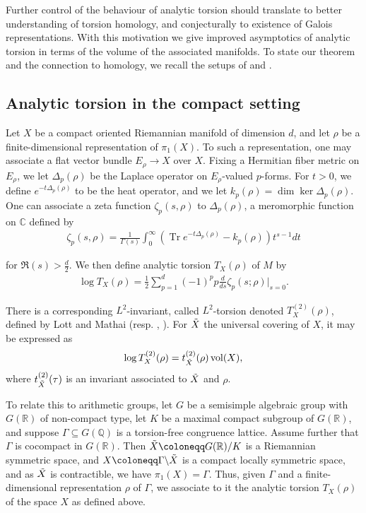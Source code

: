 \documentclass[11pt,reqno]{amsart}
\numberwithin{equation}{section}
\theoremstyle{definition}
\theoremstyle{remark}
\newcommand{\Q}{\mathbb{Q}}
\newcommand{\Tr}{\operatorname{Tr}}
\newcommand{\vol}{\operatorname{vol}}
\renewcommand{\ker}{\operatorname{ker}}
\renewcommand{\dim}{\operatorname{dim}}
\newcommand{\C}{\mathbb{C}}
\newcommand{\R}{\mathbb{R}}
\renewcommand{\subset}{\subseteq}
\begin{document}
Further control of the behaviour of analytic torsion should translate to better understanding of torsion homology, and conjecturally to existence of Galois representations. With this motivation we give improved asymptotics of analytic torsion in terms of the volume of the associated manifolds. To state our theorem and the connection to homology, we recall the setups of \cite{BV} and \cite{MzM2}.

\subsection*{Analytic torsion in the compact setting}

Let $X$ be a compact oriented Riemannian manifold of dimension $d$, and let $\rho$ be a finite-dimensional representation of $\pi_1(X)$. To such a representation, one may associate a flat vector bundle $E_\rho\to X$ over $X$. Fixing a Hermitian fiber metric on $E_\rho$, we let $\Delta_p(\rho)$ be the Laplace operator on $E_\rho$-valued $p$-forms. For $t>0$, we define $e^{-t\Delta_p(\rho)}$ to be the heat operator, and we let $k_p(\rho) =\dim\ker \Delta_p(\rho)$. One can associate a zeta function $\zeta_p(s,\rho)$ to $\Delta_p(\rho)$, a meromorphic function on $\C$ defined by
\begin{align}\label{zeta}
    \zeta_p(s,\rho) = \frac{1}{\Gamma(s)}\int_0^\infty (\Tr e^{-t\Delta_p(\rho)}-k_p(\rho))t^{s-1} dt
\end{align}

\noindent for $\Re(s)>\frac{d}{2}$. We then define analytic torsion $T_X(\rho)$ of $M$ by
\begin{align}
    \log T_X(\rho) =\frac12 \sum_{p=1}^d (-1)^p p\frac{d}{ds}\zeta_p(s;\rho)\vert_{s=0}.
\end{align}

\noindent There is a corresponding $L^2$-invariant, called $L^2$-torsion denoted $T^{(2)}_X(\rho)$, defined by Lott and Mathai (resp. \cite{Lott}, \cite{Mathai}). For $\Tilde{X}$ the universal covering of $X$, it may be expressed as
\begin{align}\label{l2torsion}
    \log T^{(2)}_X(\rho) = t^{(2)}_{\Tilde{X}}(\rho)\vol(X),
\end{align}
where $t^{(2)}_{\Tilde{X}}(\tau)$ is an invariant associated to $\Tilde{X}$ and $\rho$.

To relate this to arithmetic groups, let $G$ be a semisimple algebraic group with $G(\R)$ of non-compact type, let $K$ be a maximal compact subgroup of $G(\R)$, and suppose $\Gamma\subset G(\Q)$ is a torsion-free congruence lattice. Assume further that $\Gamma$ is cocompact in $G(\R)$. Then $\Tilde{X}\coloneqq G(\R)/K$ is a Riemannian symmetric space, and $X\coloneqq \Gamma\backslash \Tilde{X}$ is a compact locally symmetric space, and as $\Tilde{X}$ is contractible, we have $\pi_1(X)=\Gamma$. Thus, given $\Gamma$ and a finite-dimensional representation $\rho$ of $\Gamma$, we associate to it the analytic torsion $T_X(\rho)$ of the space $X$ as defined above. 
\end{document}
